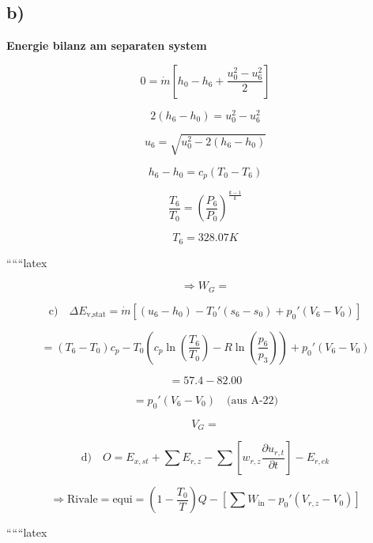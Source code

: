 \subsection*{b)}

\textbf{Energie bilanz am separaten system}

\[
0 = \dot{m} \left[ h_0 - h_6 + \frac{u_0^2 - u_6^2}{2} \right]
\]

\[
2(h_6 - h_0) = u_0^2 - u_6^2
\]

\[
u_6 = \sqrt{u_0^2 - 2(h_6 - h_0)}
\]

\[
h_6 - h_0 = c_p (T_0 - T_6)
\]

\[
\frac{T_6}{T_0} = \left( \frac{P_6}{P_0} \right)^{\frac{k-1}{k}}
\]

\[
T_6 = 328.07 K
\]

``````latex


\[
\Rightarrow W_G =
\]

\[
\text{c)} \quad \Delta E_{\text{v,stat}} = \dot{m} \left[ (u_6 - h_0) - T_0' (s_6 - s_0) + p_0' (V_6 - V_0) \right]
\]

\[
= (T_6 - T_0) c_p - T_0 \left( c_p \ln \left( \frac{T_6}{T_0} \right) - R \ln \left( \frac{p_6}{p_3} \right) \right) + p_0' (V_6 - V_0)
\]

\[
= 57.4 - 82.00
\]

\[
= p_0' (V_6 - V_0) \quad \text{(aus A-22)}
\]

\[
V_G =
\]

\[
\text{d)} \quad O = E_{x,st} + \sum E_{r,z} - \sum \left[ w_{r,z} \frac{\partial u_{r,t}}{\partial t} \right] - E_{r,ek}
\]

\[
\Rightarrow \text{Rivale} = \text{equi} = \left( 1 - \frac{T_0}{T} \right) Q - \left[ \sum W_{\text{in}} - p_0' (V_{r,z} - V_0) \right]
\]

``````latex


